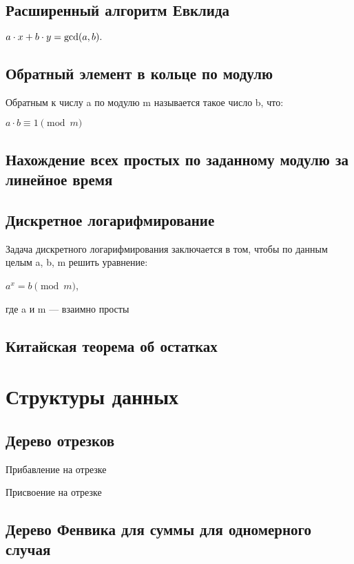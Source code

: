 \documentclass[a4paper]{article}
\begin{document}
\begin{multicols*}{2}
		\subsection{Расширенный алгоритм Евклида}
		$a \cdot x + b \cdot y = {\rm gcd} (a, b).$
		
		\subsection{Обратный элемент в кольце по модулю}
		Обратным к числу a по модулю m называется такое число b, что:
		
		$a \cdot b \equiv 1 \pmod m$
		
		\subsection{Нахождение всех простых по заданному модулю за линейное время}
		
		\subsection{Дискретное логарифмирование}
		Задача дискретного логарифмирования заключается в том, чтобы по данным целым a, b, m решить уравнение:
		
		$a^x = b \pmod m$, 
		
		где a и m — взаимно просты 
		
		\subsection{Китайская теорема об остатках}
		
		
		\section{Структуры данных}
		\subsection{Дерево отрезков}
		
		 Прибавление на отрезке
		 
		 Присвоение на отрезке
		 
		 \subsection{Дерево Фенвика для суммы для одномерного случая}
		 		 

\end{multicols*}
\end{document}
